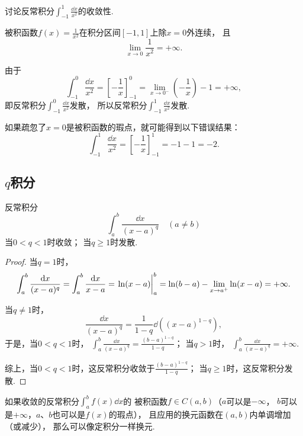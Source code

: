 \begin{example}
讨论反常积分\(\int_{-1}^1 \frac{\dd{x}}{x^2}\)的收敛性.
\begin{solution}
被积函数\(f(x) = \frac{1}{x^2}\)在积分区间\([-1,1]\)上除\(x=0\)外连续，
且\[
	\lim_{x\to0} \frac{1}{x^2} = +\infty.
\]

由于\[
	\int_{-1}^0 \frac{\dd{x}}{x^2}
	= \left[-\frac{1}{x}\right]_{-1}^0
	= \lim_{x\to0^-} \left(-\frac{1}{x}\right) - 1
	= +\infty,
\]
即反常积分\(\int_{-1}^0 \frac{\dd{x}}{x^2}\)发散，
所以反常积分\(\int_{-1}^1 \frac{\dd{x}}{x^2}\)发散.
\end{solution}
\end{example}
\begin{remark}
如果疏忽了\(x=0\)是被积函数的瑕点，就可能得到以下错误结果：\[
	\int_{-1}^1 \frac{\dd{x}}{x^2}
	= \left[ -\frac{1}{x} \right]_{-1}^1
	= -1 - 1 = -2.
\]
\end{remark}

\subsection{\texorpdfstring{\(q\)}{q}积分}
\begin{proposition}[\(q\)积分]\label{example:定积分.q积分}
反常积分\[
	\int_a^b \frac{\dd{x}}{(x-a)^q}
	\quad(a \neq b)
\]
当\(0 < q < 1\)时收敛；
当\(q \geq 1\)时发散.
\begin{proof}
当\(q=1\)时，\[
	\int_a^b \frac{\dd{x}}{(x-a)^q}
	= \int_a^b \frac{\dd{x}}{x-a}
	= \eval{\ln(x-a)}_a^b
	= \ln(b-a) - \lim_{x \to a^+} \ln(x-a)
	= +\infty.
\]

当\(q\neq1\)时，\[
	\frac{\dd{x}}{(x-a)^q}
	= \frac{1}{1-q} \dd((x-a)^{1-q}),
\]
于是，当\(0<q<1\)时，
\(\int_a^b \frac{\dd{x}}{(x-a)^q}
= \frac{(b-a)^{1-q}}{1-q}\)；
当\(q>1\)时，
\(\int_a^b \frac{\dd{x}}{(x-a)^q}
= +\infty\).

综上，当\(0<q<1\)时，这反常积分收敛于\(\frac{(b-a)^{1-q}}{1-q}\)；
当\(q\geq1\)时，这反常积分发散.
\end{proof}
\end{proposition}

如果收敛的反常积分\(\int_a^b f(x) \dd{x}\)的%
被积函数\(f \in C(a,b)\)（\(a\)可以是\(-\infty\)，
\(b\)可以是\(+\infty\)，\(a\)、\(b\)也可以是\(f(x)\)的瑕点），
且应用的换元函数在\((a,b)\)内单调增加（或减少），
那么可以像定积分一样换元.

